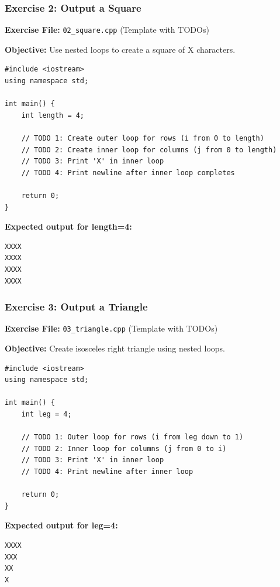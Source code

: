 \documentclass{beamer}
\begin{document}
\begin{frame}[fragile]
\frametitle{Exercise 2: Output a Square}
\textbf{Exercise File:} \texttt{02\_square.cpp} (Template with TODOs)

\textbf{Objective:} Use nested loops to create a square of X characters.\pause

\begin{verbatim}
#include <iostream>
using namespace std;

int main() {
    int length = 4;
    
    // TODO 1: Create outer loop for rows (i from 0 to length)
    // TODO 2: Create inner loop for columns (j from 0 to length)
    // TODO 3: Print 'X' in inner loop
    // TODO 4: Print newline after inner loop completes
    
    return 0;
}
\end{verbatim}

\textbf{Expected output for length=4:}
\begin{verbatim}
XXXX
XXXX
XXXX
XXXX
\end{verbatim}
\end{frame}

\begin{frame}[fragile]
\frametitle{Exercise 3: Output a Triangle}
\textbf{Exercise File:} \texttt{03\_triangle.cpp} (Template with TODOs)

\textbf{Objective:} Create isosceles right triangle using nested loops.\pause

\begin{verbatim}
#include <iostream>
using namespace std;

int main() {
    int leg = 4;
    
    // TODO 1: Outer loop for rows (i from leg down to 1)
    // TODO 2: Inner loop for columns (j from 0 to i)
    // TODO 3: Print 'X' in inner loop
    // TODO 4: Print newline after inner loop
    
    return 0;
}
\end{verbatim}

\textbf{Expected output for leg=4:}
\begin{verbatim}
XXXX
XXX
XX
X
\end{verbatim}
\end{frame}
\end{document}
